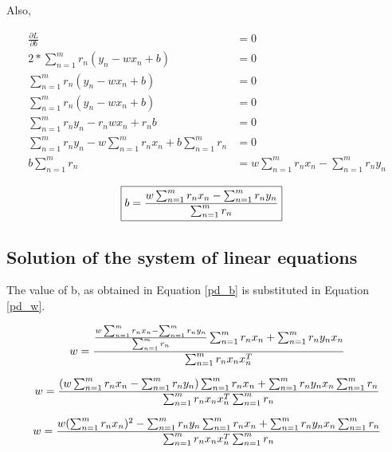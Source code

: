 \documentclass[a4paper]{article}
\begin{document}
\vspace{5mm}

Also, 

\begin{align*}
	\frac{\partial L}{\partial b} &= 0\\
	2 * \sum_{n=1}^m r_n (y_n − w x_n + b) &= 0\\
	\sum_{n=1}^m r_n (y_n − w x_n + b) &= 0\\
	\sum_{n=1}^m r_n (y_n − w x_n + b) &= 0\\
	\sum_{n=1}^m r_n y_n − r_n w x_n + r_n b &= 0\\
	\sum_{n=1}^m r_n y_n − w \sum_{n=1}^m r_n x_n + b \sum_{n=1}^m r_n &= 0\\
	b \sum_{n=1}^m r_n &= w \sum_{n=1}^m r_n x_n - \sum_{n=1}^m r_n y_n
\end{align*}


\begin{align}
\label{pd_b}
	\Aboxed{b = \frac{w \sum_{n=1}^m r_n x_n - \sum_{n=1}^m  r_n y_n}{\sum_{n=1}^m  r_n}}
\end{align}


\subsection{Solution of the system of linear equations}

The value of b, as obtained in Equation \ref{pd_b} is substituted in Equation \ref{pd_w}.

$$w  = \frac{\frac{w \sum_{n=1}^{\\m}r_n x_n - \sum_{n=1}^{\\m} r_n y_n}{\sum_{n=1}^{\\m} r_n} \sum_{n=1}^{\\m} r_n x_n + \sum_{n=1}^{\\m} r_n y_n x_n} {\sum_{n=1}^{\\m}r_n x_n x_n^T}$$

$$w  = \frac{(w \sum_{n=1}^{\\m}r_n x_n - \sum_{n=1}^{\\m} r_n y_n) \sum_{n=1}^{\\m} r_n x_n + \sum_{n=1}^{\\m} r_n y_n x_n \sum_{n=1}^{\\m} r_n} {\sum_{n=1}^{\\m}r_n x_n x_n^T \sum_{n=1}^{\\m} r_n}$$

$$w  = \frac{w ({\sum_{n=1}^{\\m}r_n x_n})^2 - \sum_{n=1}^{\\m} r_n y_n \sum_{n=1}^{\\m} r_n x_n + \sum_{n=1}^{\\m} r_n y_n x_n \sum_{n=1}^{\\m} r_n} {\sum_{n=1}^{\\m}r_n x_n x_n^T \sum_{n=1}^{\\m} r_n}$$
\end{document}
